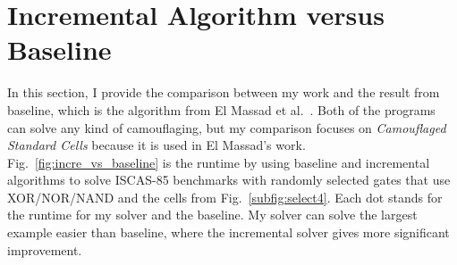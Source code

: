 \documentclass[thesis]{umassthesis}  %
\begin{document}
\section{Incremental Algorithm versus Baseline}

In this section, I provide the comparison between my work and the result from baseline, which is the algorithm from El Massad et al.~\cite{elmassad-15}. Both of the programs can solve any kind of camouflaging, but my comparison focuses on \textit{Camouflaged Standard Cells} because it is used in El Massad's work.  Fig.~\ref{fig:incre_vs_baseline} is the runtime by using baseline and incremental algorithms to solve ISCAS-85 benchmarks with randomly selected gates that use XOR/NOR/NAND and the cells from Fig.~\ref{subfig:select4}.  Each dot stands for the runtime for my solver and the baseline. My solver can solve the largest example easier than baseline, where the incremental solver gives more significant improvement.


\end{document}
